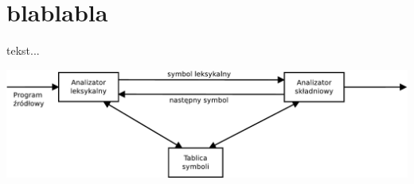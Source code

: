 \documentclass[a4paper]{article}
\begin{document}
\section*{blablabla}
tekst...
\begin{center}
	\includegraphics[scale=0.4]{Diagram1}
\end{center}
\end{document}
